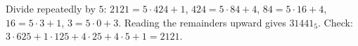 Divide repeatedly by $5$: $2121=5\cdot424+1$, $424=5\cdot84+4$, $84=5\cdot16+4$, $16=5\cdot3+1$, $3=5\cdot0+3$. Reading the remainders upward gives $\boxed{31441_5}$. Check: $3\cdot625+1\cdot125+4\cdot25+4\cdot5+1=2121$.
